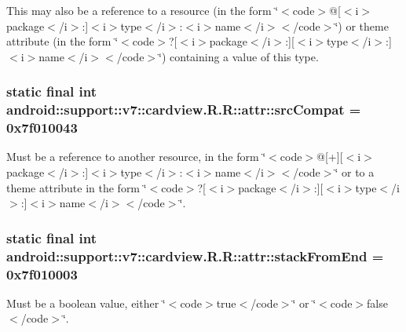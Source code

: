 This may also be a reference to a resource (in the form \char`\"{}$<$code$>$@\mbox{[}$<$i$>$package$<$/i$>$:\mbox{]}$<$i$>$type$<$/i$>$:$<$i$>$name$<$/i$>$$<$/code$>$\char`\"{}) or theme attribute (in the form \char`\"{}$<$code$>$?\mbox{[}$<$i$>$package$<$/i$>$:\mbox{]}\mbox{[}$<$i$>$type$<$/i$>$:\mbox{]}$<$i$>$name$<$/i$>$$<$/code$>$\char`\"{}) containing a value of this type. \hypertarget{classandroid_1_1support_1_1v7_1_1cardview_1_1_r_1_1attr_90a60940d3b5c748eb70025dac5232f6}{
\subsubsection[{srcCompat}]{\setlength{\rightskip}{0pt plus 5cm}static final int android::support::v7::cardview.R.R::attr::srcCompat = 0x7f010043}}
\label{classandroid_1_1support_1_1v7_1_1cardview_1_1_r_1_1attr_90a60940d3b5c748eb70025dac5232f6}


Must be a reference to another resource, in the form \char`\"{}$<$code$>$@\mbox{[}+\mbox{]}\mbox{[}$<$i$>$package$<$/i$>$:\mbox{]}$<$i$>$type$<$/i$>$:$<$i$>$name$<$/i$>$$<$/code$>$\char`\"{} or to a theme attribute in the form \char`\"{}$<$code$>$?\mbox{[}$<$i$>$package$<$/i$>$:\mbox{]}\mbox{[}$<$i$>$type$<$/i$>$:\mbox{]}$<$i$>$name$<$/i$>$$<$/code$>$\char`\"{}. \hypertarget{classandroid_1_1support_1_1v7_1_1cardview_1_1_r_1_1attr_e777b86b203e1f2925db12419e610209}{
\subsubsection[{stackFromEnd}]{\setlength{\rightskip}{0pt plus 5cm}static final int android::support::v7::cardview.R.R::attr::stackFromEnd = 0x7f010003}}
\label{classandroid_1_1support_1_1v7_1_1cardview_1_1_r_1_1attr_e777b86b203e1f2925db12419e610209}


Must be a boolean value, either \char`\"{}$<$code$>$true$<$/code$>$\char`\"{} or \char`\"{}$<$code$>$false$<$/code$>$\char`\"{}. 

